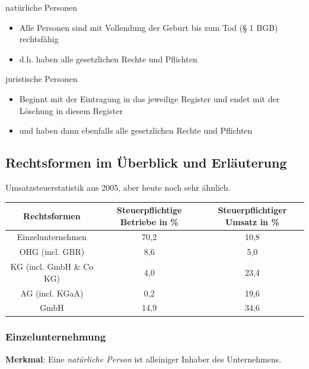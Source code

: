 \documentclass[]{article}
\begin{document}
\begin{minipage}[t]{0.45\textwidth}
	natürliche Personen
	\begin{itemize}
		\item Alle Personen sind mit Vollendung der Geburt bis zum Tod (§ 1 BGB) rechtsfähig
		\item d.h. haben alle gesetzlichen Rechte und Pflichten
	\end{itemize}
\end{minipage}
\hfill
\begin{minipage}[t]{0.45\textwidth}
	juristische Personen
	\begin{itemize}
		\item Beginnt mit der Eintragung in	das jeweilige Register und endet mit der Löschung in diesem Register
		\item und haben dann ebenfalls alle gesetzlichen Rechte und Pflichten
	\end{itemize}
\end{minipage}

\newpage
\subsection{Rechtsformen im Überblick und Erläuterung}

Umsatzsteuerstatistik aus 2005, aber heute noch sehr ähnlich.

\begin{tabular}{|c|c|c|}
	\hline
	Rechtsformen & Steuerpflichtige Betriebe in \% & Steuerpflichtiger Umsatz in \% \\
	\hline
	Einzelunternehmen & 70,2 & 10,8 \\
	\hline
	OHG (incl. GBR) & 8,6 & 5,0 \\
	\hline
	KG (incl. GmbH \& Co KG) & 4,0 & 23,4 \\
	\hline
	AG (incl. KGaA) & 0,2 & 19,6 \\
	\hline
	GmbH & 14,9 & 34,6 \\
	\hline
\end{tabular}

\subsubsection{Einzelunternehmung}
\textbf{Merkmal}: Eine \textit{natürliche Person} ist alleiniger Inhaber des Unternehmens.
\end{document}
